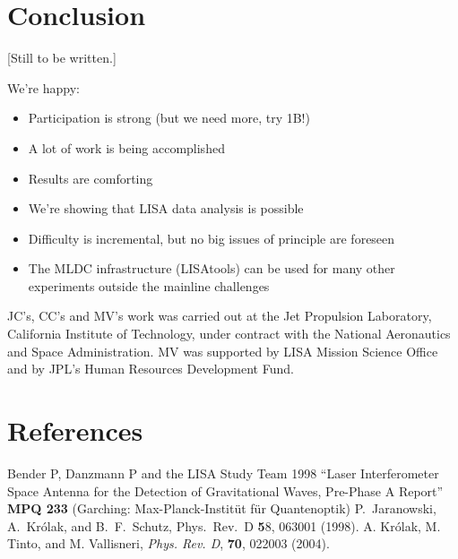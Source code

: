 \documentclass{iopart}
\begin{document}
\section{Conclusion}

[Still to be written.]

We're happy:

\begin{itemize}
\item Participation is strong (but we need more, try 1B!)
\item A lot of work is being accomplished
\item Results are comforting
\item We’re showing that LISA data analysis is possible
\item Difficulty is incremental, but no big issues of principle are foreseen
\item The MLDC infrastructure (LISAtools) can be used for many other experiments outside the mainline challenges
\end{itemize}



\ack

JC's, CC's and MV's work was carried out at the Jet Propulsion Laboratory, California Institute of Technology, under contract with the National Aeronautics and Space Administration. MV was supported by LISA Mission Science Office and by JPL's Human Resources Development Fund.



\section*{References}

\begin{thebibliography}{99}
%
 Bender P, Danzmann P and
  the LISA Study Team 1998 ``Laser Interferometer Space Antenna for the Detection of Gravitational Waves, Pre-Phase A Report'' \textbf{MPQ 233} (Garching: Max-Planck-Instit\"ut f\"ur
  Quantenoptik) 
%
P.\ Jaranowski, A.\ Kr\'olak, and B.\ F.\ Schutz, Phys.\ Rev.\ D
{\textbf 58}, 063001 (1998).
%
 A. Kr\'olak, M. Tinto, and M. Vallisneri, {\it Phys. Rev. D}, {\bf 70},
022003 (2004).
%
\end{thebibliography}
\end{document}
